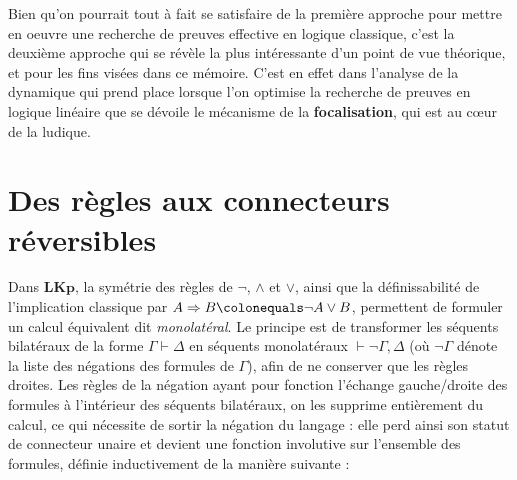 \documentclass[12pt]{report}
\newcommand{\lto}{\Rightarrow}
\newcommand{\seq}{\vdash}
\newtheorem{definition}{Définition}
\begin{document}
Bien qu'on pourrait tout à fait se satisfaire de la première approche pour mettre en oeuvre une recherche de preuves effective en logique classique, c'est la deuxième approche qui se révèle la plus intéressante d'un point de vue théorique, et pour les fins visées dans ce mémoire. C'est en effet dans l'analyse de la dynamique qui prend place lorsque l'on optimise la recherche de preuves en logique linéaire que se dévoile le mécanisme de la \textbf{focalisation}, qui est au cœur de la ludique.

\chapter*{Des règles aux connecteurs réversibles}



Dans $\mathbf{LKp}$, la symétrie des règles de $\neg$, $\land$ et $\lor$, ainsi que la définissabilité de l'implication classique par $A \lto B \colonequals \neg A \lor B$, permettent de formuler un calcul équivalent dit \emph{monolatéral}. Le principe est de transformer les séquents bilatéraux de la forme $\Gamma \seq \Delta$ en séquents monolatéraux $\seq \neg \Gamma,\Delta$ (où $\neg \Gamma$ dénote la liste des négations des formules de $\Gamma$), afin de ne conserver que les règles droites. Les règles de la négation ayant pour fonction l'échange gauche/droite des formules à l'intérieur des séquents bilatéraux, on les supprime entièrement du calcul, ce qui nécessite de sortir la négation du langage : elle perd ainsi son statut de connecteur unaire et devient une fonction involutive sur l'ensemble des formules, définie inductivement de la manière suivante :
\end{document}
